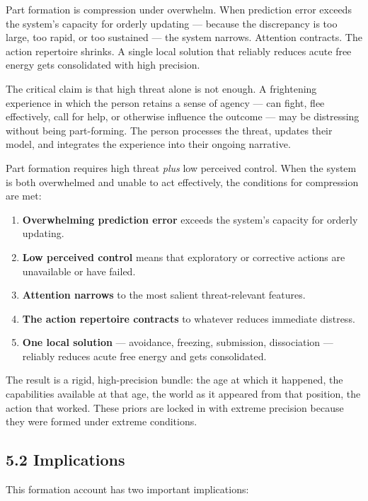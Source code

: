 \documentclass[11pt]{article}
\providecommand{\tightlist}{%
  \setlength{\itemsep}{0pt}\setlength{\parskip}{0pt}}
\begin{document}
Part formation is compression under overwhelm. When prediction error
exceeds the system's capacity for orderly updating --- because the
discrepancy is too large, too rapid, or too sustained --- the system
narrows. Attention contracts. The action repertoire shrinks. A single
local solution that reliably reduces acute free energy gets consolidated
with high precision.

The critical claim is that high threat alone is not enough. A
frightening experience in which the person retains a sense of agency ---
can fight, flee effectively, call for help, or otherwise influence the
outcome --- may be distressing without being part-forming. The person
processes the threat, updates their model, and integrates the experience
into their ongoing narrative.

Part formation requires high threat \emph{plus} low perceived control.
When the system is both overwhelmed and unable to act effectively, the
conditions for compression are met:

\begin{enumerate}
\def\labelenumi{\arabic{enumi}.}
\tightlist
\item
  \textbf{Overwhelming prediction error} exceeds the system's capacity
  for orderly updating.
\item
  \textbf{Low perceived control} means that exploratory or corrective
  actions are unavailable or have failed.
\item
  \textbf{Attention narrows} to the most salient threat-relevant
  features.
\item
  \textbf{The action repertoire contracts} to whatever reduces immediate
  distress.
\item
  \textbf{One local solution} --- avoidance, freezing, submission,
  dissociation --- reliably reduces acute free energy and gets
  consolidated.
\end{enumerate}

The result is a rigid, high-precision bundle: the age at which it
happened, the capabilities available at that age, the world as it
appeared from that position, the action that worked. These priors are
locked in with extreme precision because they were formed under extreme
conditions.

\subsection{5.2 Implications}\label{implications}

This formation account has two important implications:
\end{document}
